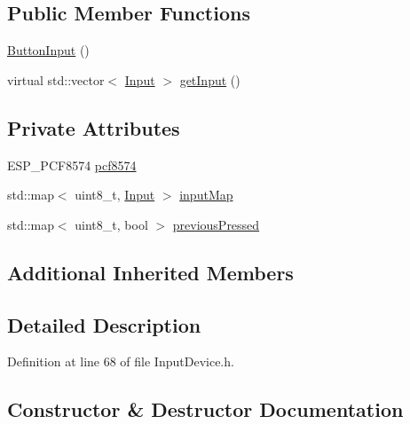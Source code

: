 \subsection*{Public Member Functions}
\begin{DoxyCompactItemize}
\item 
\hyperlink{class_button_input_a7f69a48d6e8e7f3db4794bc21c40d396}{Button\+Input} ()
\item 
virtual std\+::vector$<$ \hyperlink{class_input_device_a75152d8f06b6d032036014e42e44688b}{Input} $>$ \hyperlink{class_button_input_ab893731e65a4de626ad729cb9582da96}{get\+Input} ()
\end{DoxyCompactItemize}
\subsection*{Private Attributes}
\begin{DoxyCompactItemize}
\item 
E\+S\+P\+\_\+\+P\+C\+F8574 \hyperlink{class_button_input_adcda808bd27b4cb481e2630b07fe98d9}{pcf8574}
\item 
std\+::map$<$ uint8\+\_\+t, \hyperlink{class_input_device_a75152d8f06b6d032036014e42e44688b}{Input} $>$ \hyperlink{class_button_input_a0913f24cb28e4c72063134e9c58450b2}{input\+Map}
\item 
std\+::map$<$ uint8\+\_\+t, bool $>$ \hyperlink{class_button_input_af8ee1752f6b9bba394f868a5401697f4}{previous\+Pressed}
\end{DoxyCompactItemize}
\subsection*{Additional Inherited Members}


\subsection{Detailed Description}


Definition at line 68 of file Input\+Device.\+h.



\subsection{Constructor \& Destructor Documentation}
\mbox{\label{class_button_input_a7f69a48d6e8e7f3db4794bc21c40d396}} 

